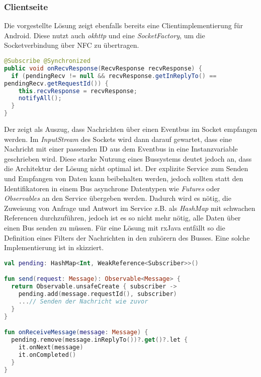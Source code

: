 	\subsubsection{Clientseite}
	    Die vorgestellte Lösung zeigt ebenfalls bereits eine Clientimplementierung für Android. Diese nutzt auch {\it okhttp} und eine {\it SocketFactory}, um die Socketverbindung über NFC zu übertragen.
	    \begin{lstlisting}[frame=bt, label={lst:nfc:apdu}, language=Java, caption=Datenempfang über NFC (Clientcode in Java) \cite{nfcSocketsClient}]
@Subscribe @Synchronized
public void onRecvResponse(RecvResponse recvResponse) {
  if (pendingRecv != null && recvResponse.getInReplyTo() ==
pendingRecv.getRequestId()) {
    this.recvResponse = recvResponse;
    notifyAll();
  }
}
        \end{lstlisting}
        Der  zeigt als Auszug, dass Nachrichten über einen Eventbus im Socket empfangen werden. Im {\it InputStream} des Sockets wird dann darauf gewartet, dass eine Nachricht mit einer passenden ID aus dem Eventbus in eine Instanzvariable geschrieben wird. Diese starke Nutzung eines Bussystems deutet jedoch an, dass die Architektur der Lösung nicht optimal ist. Der explizite Service zum Senden und Empfangen von Daten kann beibehalten werden, jedoch sollten statt den Identifikatoren in einem Bus asynchrone Datentypen wie {\it Futures} oder {\it Observables} an den Service übergeben werden. Dadurch wird es nötig, die Zuweisung von Anfrage und Antwort im Service z.B. als {\it HashMap} mit schwachen Referencen durchzuführen, jedoch ist es so nicht mehr nötig, alle Daten über einen Bus senden zu müssen. Für eine Lösung mit rxJava entfällt so die Definition eines Filters der Nachrichten in den zuhörern des Busses. Eine solche Implementierung ist in  skizziert.
        \begin{lstlisting}[frame=bt, label={lst:nfc:apduAsync}, language=Kotlin, caption=Datenempfang über Observables (Clientcode in Kotlin)]
val pending: HashMap<Int, WeakReference<Subscriber>>()

fun send(request: Message): Observable<Message> {
  return Observable.unsafeCreate { subscriber ->
    pending.add(message.requestId(), subscriber)
    ...// Senden der Nachricht wie zuvor
  }
}

fun onReceiveMessage(message: Message) {
  pending.remove(message.inReplyTo())?.get()?.let {
    it.onNext(message)
    it.onCompleted()
  }
}
        \end{lstlisting}
        
